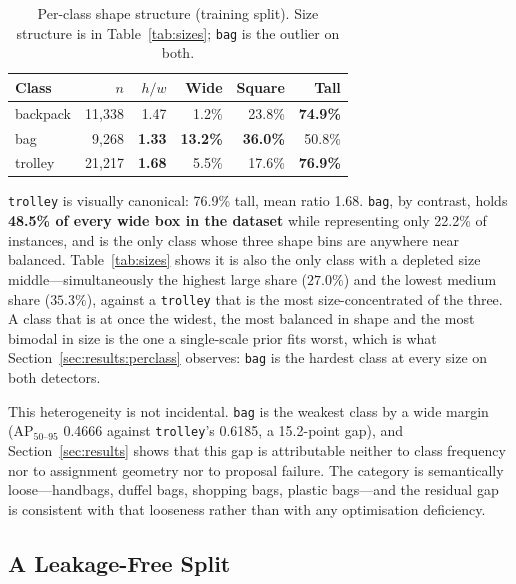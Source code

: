 \documentclass[10pt,twocolumn,a4paper]{article}
\begin{document}
\begin{table}[t]
\centering
\caption{Per-class shape structure (training split). Size structure is in
Table~\ref{tab:sizes}; \texttt{bag} is the outlier on both.}
\label{tab:shape}
\footnotesize
\setlength{\tabcolsep}{3.5pt}
\begin{tabular}{@{}lrrrrr@{}}
\toprule
\textbf{Class} & \textbf{$n$} & \textbf{$h/w$} & \textbf{Wide} & \textbf{Square} & \textbf{Tall} \\
\midrule
backpack & 11{,}338 & 1.47 & 1.2\% & 23.8\% & \textbf{74.9\%} \\
bag      & 9{,}268  & \textbf{1.33} & \textbf{13.2\%} & \textbf{36.0\%} & 50.8\% \\
trolley  & 21{,}217 & \textbf{1.68} & 5.5\% & 17.6\% & \textbf{76.9\%} \\
\bottomrule
\end{tabular}
\end{table}

\texttt{trolley} is visually canonical: 76.9\% tall, mean ratio 1.68.
\texttt{bag}, by contrast, holds \textbf{48.5\% of every wide box in the dataset}
while representing only 22.2\% of instances, and is the only class whose three
shape bins are anywhere near balanced. Table~\ref{tab:sizes} shows it is also
the only class with a depleted size middle---simultaneously the highest large
share ($27.0\%$) and the lowest medium share ($35.3\%$), against a
\texttt{trolley} that is the most size-concentrated of the three. A class that
is at once the widest, the most balanced in shape and the most bimodal in size
is the one a single-scale prior fits worst, which is what
Section~\ref{sec:results:perclass} observes: \texttt{bag} is the hardest class
at every size on both detectors.

This heterogeneity is not incidental. \texttt{bag} is the weakest class by a wide
margin (AP$_{50\text{--}95}$ 0.4666 against \texttt{trolley}'s 0.6185, a 15.2-point
gap), and Section~\ref{sec:results} shows that this gap is attributable neither to
class frequency nor to assignment geometry nor to proposal failure. The category
is semantically loose---handbags, duffel bags, shopping bags, plastic bags---and
the residual gap is consistent with that looseness rather than with any
optimisation deficiency.

\subsection{A Leakage-Free Split}
\label{sec:dataset:leakage}
\end{document}
